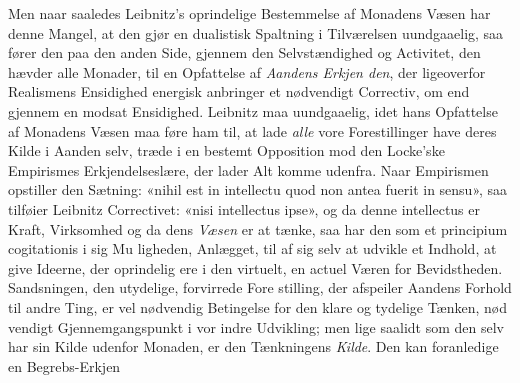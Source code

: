 \documentclass[12pt,a4paper]{book}
\begin{document}
Men naar saaledes Leibnitz's oprindelige Bestemmelse af
Monadens Væsen har denne Mangel, at den gjør en dualistisk
Spaltning i Tilværelsen uundgaaelig, saa fører den paa den
anden Side, gjennem den Selvstændighed og Activitet, den
hævder alle Monader, til en Opfattelse af \emph{Aandens Erkjen\-%
den}, der ligeoverfor Realismens Ensidighed energisk anbringer
et nødvendigt Correctiv, om end gjennem en modsat Ensidighed.
Leibnitz maa uundgaaelig, idet hans Opfattelse af Monadens
Væsen maa føre ham til, at lade \emph{alle} vore Forestillinger have
deres Kilde i Aanden selv, træde i en bestemt Opposition mod
den Locke'ske Empirismes Erkjendelseslære, der lader Alt
komme udenfra. Naar Empirismen opstiller den Sætning:
«nihil est in intellectu quod non antea fuerit in sensu», saa
tilføier Leibnitz Correctivet: «nisi intellectus ipse», og da denne
intellectus er Kraft, Virksomhed og da dens \emph{Væsen} er at
tænke, saa har den som et principium cogitationis i sig Mu\-%
ligheden, Anlægget, til af sig selv at udvikle et Indhold, at
give Ideerne, der oprindelig ere i den virtuelt, en actuel Væren
for Bevidstheden. Sandsningen, den utydelige, forvirrede Fore\-%
stilling, der afspeiler Aandens Forhold til andre Ting, er vel
nødvendig Betingelse for den klare og tydelige Tænken, nød\-%
vendigt Gjennemgangspunkt i vor indre Udvikling; men lige\-%
saalidt som den selv har sin Kilde udenfor Monaden, er den
Tænkningens \emph{Kilde}. Den kan foranledige en Begrebs-Erkjen\-%
\end{document}
